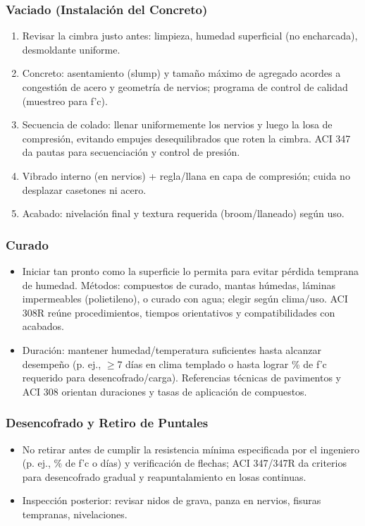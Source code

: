 \documentclass[12pt]{article}
\begin{document}
	\subsubsection{Vaciado (Instalación del Concreto)}
	\begin{enumerate}
		\item Revisar la cimbra justo antes: limpieza, humedad superficial (no encharcada), desmoldante uniforme.
		\item Concreto: asentamiento (slump) y tamaño máximo de agregado acordes a congestión de acero y geometría de nervios; programa de control de calidad (muestreo para f’c).
		\item Secuencia de colado: llenar uniformemente los nervios y luego la losa de compresión, evitando empujes desequilibrados que roten la cimbra. ACI 347 da pautas para secuenciación y control de presión.
		\item Vibrado interno (en nervios) + regla/llana en capa de compresión; cuida no desplazar casetones ni acero.
		\item Acabado: nivelación final y textura requerida (broom/llaneado) según uso.
	\end{enumerate}
	
	\subsubsection{ Curado}
	\begin{itemize}
		\item Iniciar tan pronto como la superficie lo permita para evitar pérdida temprana de humedad. Métodos: compuestos de curado, mantas húmedas, láminas impermeables (polietileno), o curado con agua; elegir según clima/uso. ACI 308R reúne procedimientos, tiempos orientativos y compatibilidades con acabados.
		\item Duración: mantener humedad/temperatura suficientes hasta alcanzar desempeño (p. ej., $\geq$7 días en clima templado o hasta lograr \% de f’c requerido para desencofrado/carga). Referencias técnicas de pavimentos y ACI 308 orientan duraciones y tasas de aplicación de compuestos.
	\end{itemize}
	
	\subsubsection{ Desencofrado y Retiro de Puntales}
	\begin{itemize}
		\item No retirar antes de cumplir la resistencia mínima especificada por el ingeniero (p. ej., \% de f’c o días) y verificación de flechas; ACI 347/347R da criterios para desencofrado gradual y reapuntalamiento en losas continuas.
		\item Inspección posterior: revisar nidos de grava, panza en nervios, fisuras tempranas, nivelaciones.
	\end{itemize}
	
\end{document}
